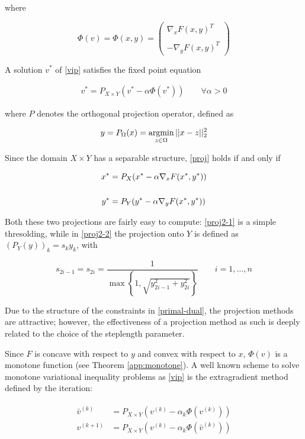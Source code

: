 where

$$\Phi(v) = \Phi(x,y) = \begin{pmatrix}
\nabla_x F(x,y)^T \\
\\
-\nabla_y F(x,y)^T\end{pmatrix}
$$

A solution $v^*$ of \eqref{vip} satisfies the fixed point equation

\begin{align}
\label{proj}
v^* = P_{X \times Y} (v^* - \alpha \Phi(v^*)) \qquad \forall \alpha > 0
\end{align}

where $P$ denotes the orthogonal projection operator, defined as

$$y = P_\Omega (x) = \mathop{\mathrm{argmin}}\limits_{z \in \Omega} ||x-z||_2^2$$

Since the domain $X \times Y$ has a separable structure, \eqref{proj} holds if and only if

\begin{align}
\label{proj2-1} x^* &= P_X (x^* - \alpha \nabla_x F(x^*,y^*)) \\
\notag \\
\label{proj2-2} y^* &= P_Y (y^* - \alpha \nabla_y F(x^*,y^*))
\end{align}

Both these two projections are fairly easy to compute: \eqref{proj2-1} is a simple thresolding, while in \eqref{proj2-2} the projection onto $Y$ is defined as $(P_Y (y))_k = s_ky_k$, with

$$s_{2i-1} = s_{2i} = \dfrac{1}{\max\left\{1,\sqrt{y_{2i-1}^2+y_{2i}^2}\right\}} \qquad i=1,\dots,n$$

Due to the structure of the constraints in \eqref{primal-dual}, the projection methods are attractive; however, the effectiveness of a projection method as such is deeply related to the choice of the steplength parameter.

Since $F$ is concave with respect to $y$ and convex with respect to $x$, $\Phi(v)$ is a monotone function (see Theorem \ref{app:monotone}). A well known scheme to solve monotone variational inequality problems as \eqref{vip} is the extragradient method defined by the iteration:

\begin{align}
\label{extragradient_method}
\begin{aligned}
\bar{v}^{(k)} &= P_{X \times Y} \left(v^{(k)}-\alpha_k \Phi\left(v^{(k)}\right)\right) \\
v^{(k+1)} &= P_{X \times Y} \left(v^{(k)} - \alpha_k \Phi\left(\bar{v}^{(k)}\right)\right)
\end{aligned}
\end{align}

